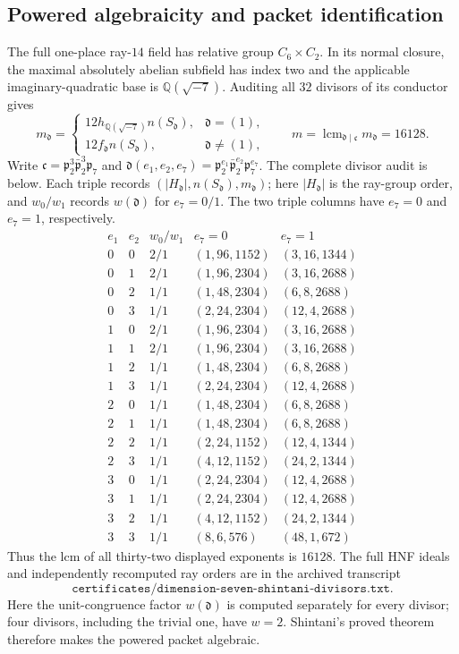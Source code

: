 \documentclass[11pt]{article}
\newcommand{\Q}{\mathbb Q}
\begin{document}
\subsection{Powered algebraicity and packet identification}

The full one-place ray-$14$ field has relative group
$C_6\times C_2$.  In its normal closure, the maximal absolutely
abelian subfield has index two and the applicable imaginary-quadratic
base is $\Q(\sqrt{-7})$.  Auditing all $32$ divisors of its conductor
gives
\[
 m_{\mathfrak d}=
 \begin{cases}
 12h_{\Q(\sqrt{-7})}n(S_{\mathfrak d}),&\mathfrak d=(1),\\
 12f_{\mathfrak d}n(S_{\mathfrak d}),&\mathfrak d\ne(1),
 \end{cases}
 \qquad
 m=\operatorname{lcm}_{\mathfrak d\mid\mathfrak c}
 m_{\mathfrak d}=16128.
\tag{15}
\]
Write
$\mathfrak c=\mathfrak p_2^3\bar{\mathfrak p}_2^3\mathfrak p_7$ and
$\mathfrak d(e_1,e_2,e_7)
=\mathfrak p_2^{e_1}\bar{\mathfrak p}_2^{e_2}
\mathfrak p_7^{e_7}$. The complete divisor audit is below.
Each triple records
\((|H_{\mathfrak d}|,n(S_{\mathfrak d}),m_{\mathfrak d})\);
here $|H_{\mathfrak d}|$ is the ray-group order, and $w_0/w_1$
records $w(\mathfrak d)$ for $e_7=0/1$. The two triple columns have
$e_7=0$ and $e_7=1$, respectively.
\[
\begin{array}{cc|c|c|c}
e_1&e_2&w_0/w_1&e_7=0&e_7=1\\ \hline
0&0&2/1&(1,96,1152)&(3,16,1344)\\
0&1&2/1&(1,96,2304)&(3,16,2688)\\
0&2&1/1&(1,48,2304)&(6,8,2688)\\
0&3&1/1&(2,24,2304)&(12,4,2688)\\
1&0&2/1&(1,96,2304)&(3,16,2688)\\
1&1&2/1&(1,96,2304)&(3,16,2688)\\
1&2&1/1&(1,48,2304)&(6,8,2688)\\
1&3&1/1&(2,24,2304)&(12,4,2688)\\
2&0&1/1&(1,48,2304)&(6,8,2688)\\
2&1&1/1&(1,48,2304)&(6,8,2688)\\
2&2&1/1&(2,24,1152)&(12,4,1344)\\
2&3&1/1&(4,12,1152)&(24,2,1344)\\
3&0&1/1&(2,24,2304)&(12,4,2688)\\
3&1&1/1&(2,24,2304)&(12,4,2688)\\
3&2&1/1&(4,12,1152)&(24,2,1344)\\
3&3&1/1&(8,6,576)&(48,1,672)
\end{array}
\]
Thus the lcm of all thirty-two displayed exponents is $16128$.
The full HNF ideals and independently recomputed ray orders are in the
archived transcript
\[
\texttt{certificates/dimension-seven-shintani-divisors.txt}.
\]
Here the unit-congruence factor
$w(\mathfrak d)$ is computed separately for every divisor; four
divisors, including the trivial one, have $w=2$.  Shintani's proved
theorem~\cite{Shintani1978} therefore makes the powered packet
algebraic.
\end{document}
